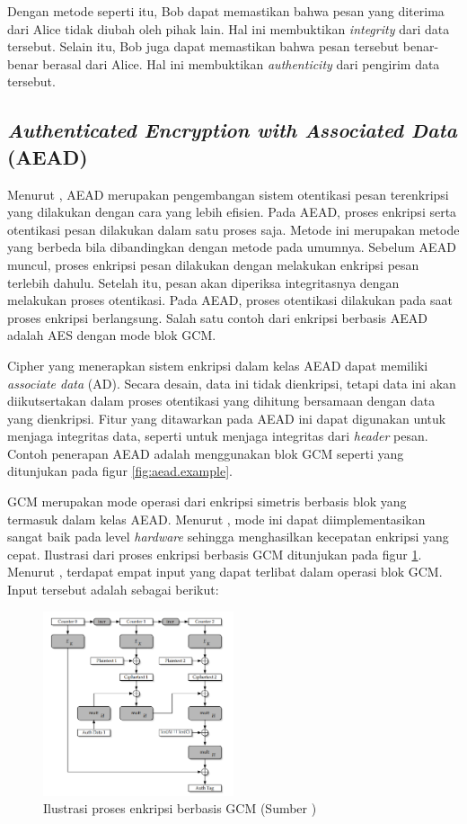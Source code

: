 \documentclass[conference]{IEEEtran}
\begin{document}
Dengan metode seperti itu, Bob dapat memastikan bahwa pesan yang diterima dari Alice tidak diubah oleh pihak lain. Hal ini membuktikan \emph{integrity} dari data tersebut. Selain itu, Bob juga dapat memastikan bahwa pesan tersebut benar-benar berasal dari Alice. Hal ini membuktikan \emph{authenticity} dari pengirim data tersebut.

\subsection{\emph{Authenticated Encryption with Associated Data} (AEAD)}
\label{sec:aead}

Menurut \cite{rogaway2002}, AEAD merupakan pengembangan sistem otentikasi pesan terenkripsi yang dilakukan dengan cara yang lebih efisien. Pada AEAD, proses enkripsi serta otentikasi pesan dilakukan dalam satu proses saja. Metode ini merupakan metode yang berbeda bila dibandingkan dengan metode pada umumnya. Sebelum AEAD muncul, proses enkripsi pesan dilakukan dengan melakukan enkripsi pesan terlebih dahulu. Setelah itu, pesan akan diperiksa integritasnya dengan melakukan proses otentikasi. Pada AEAD, proses otentikasi dilakukan pada saat proses enkripsi berlangsung. Salah satu contoh dari enkripsi berbasis AEAD adalah AES dengan mode blok GCM.

Cipher yang menerapkan sistem enkripsi dalam kelas AEAD dapat memiliki \emph{associate data} (AD). Secara desain, data ini tidak dienkripsi, tetapi data ini akan diikutsertakan dalam proses otentikasi yang dihitung bersamaan dengan data yang dienkripsi. Fitur yang ditawarkan pada AEAD ini dapat digunakan untuk menjaga integritas data, seperti untuk menjaga integritas dari \emph{header} pesan. Contoh penerapan AEAD adalah menggunakan blok GCM seperti yang ditunjukan pada figur \ref{fig:aead.example}.


GCM merupakan mode operasi dari enkripsi simetris berbasis blok yang termasuk dalam kelas AEAD. Menurut \cite{mcgrew2005}, mode ini dapat diimplementasikan sangat baik pada level \emph{hardware} sehingga menghasilkan kecepatan enkripsi yang cepat. Ilustrasi dari proses enkripsi berbasis GCM ditunjukan pada figur \ref{fig1}. Menurut \cite{mcgrew2005}, terdapat empat input yang dapat terlibat dalam operasi blok GCM. Input tersebut adalah sebagai berikut:

\begin{figure}[htbp]
    \centerline{\includegraphics[width=0.5\textwidth]{res/fig1.png}}

    \caption{Ilustrasi proses enkripsi berbasis GCM (Sumber \cite{mcgrew2005})}
    \label{fig1}
\end{figure}
\end{document}
